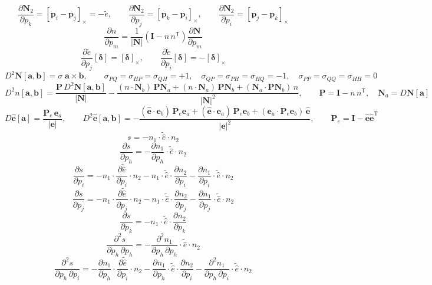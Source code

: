\[ \frac{\partial \mathbf{N}_2}{\partial p_k} = [\mathbf{p}_i - \mathbf{p}_j]_\times = -\tilde{e},\qquad \frac{\partial \mathbf{N}_2}{\partial p_j} = [\mathbf{p}_k - \mathbf{p}_i]_\times,\qquad \frac{\partial \mathbf{N}_2}{\partial p_i} = [\mathbf{p}_j - \mathbf{p}_k]_\times \]
\[ \frac{\partial n}{\partial p_m} = \frac{1}{|\mathbf{N}|}\left(\mathbf{I} - n\,n^{\mathsf T}\right)\frac{\partial \mathbf{N}}{\partial p_m} \]
\[ \frac{\partial \tilde{e}}{\partial p_j}[\boldsymbol\delta] = [\boldsymbol\delta]_\times,\qquad \frac{\partial \tilde{e}}{\partial p_i}[\boldsymbol\delta] = -[\boldsymbol\delta]_\times \]
\[ D^2\mathbf{N}[\mathbf{a}, \mathbf{b}] = \sigma\;\mathbf{a}\times\mathbf{b},\qquad \sigma_{PQ} = \sigma_{HP} = \sigma_{QH} = +1,\quad \sigma_{QP} = \sigma_{PH} = \sigma_{HQ} = -1,\quad \sigma_{PP} = \sigma_{QQ} = \sigma_{HH} = 0 \]
\[ D^2 n[\mathbf{a}, \mathbf{b}] = \frac{\mathbf{P}\,D^2\mathbf{N}[\mathbf{a}, \mathbf{b}]}{|\mathbf{N}|} - \frac{(n\cdot \mathbf{N}_b)\,\mathbf{P}\mathbf{N}_a + (n\cdot \mathbf{N}_a)\,\mathbf{P}\mathbf{N}_b + (\mathbf{N}_a\cdot\mathbf{P}\mathbf{N}_b)\,n}{|\mathbf{N}|^2},\qquad \mathbf{P} = \mathbf{I} - n\,n^{\mathsf T},\quad \mathbf{N}_a = D\mathbf{N}[\mathbf{a}] \]
\[ D\hat{\mathbf{e}}[\mathbf{a}] = \frac{\mathbf{P}_e\,\mathbf{e}_a}{|\mathbf{e}|},\qquad D^2\hat{\mathbf{e}}[\mathbf{a}, \mathbf{b}] = -\frac{(\hat{\mathbf{e}}\cdot\mathbf{e}_b)\,\mathbf{P}_e\mathbf{e}_a + (\hat{\mathbf{e}}\cdot\mathbf{e}_a)\,\mathbf{P}_e\mathbf{e}_b + (\mathbf{e}_a\cdot\mathbf{P}_e\mathbf{e}_b)\,\hat{\mathbf{e}}}{|\mathbf{e}|^2},\qquad \mathbf{P}_e = \mathbf{I} - \hat{\mathbf{e}}\hat{\mathbf{e}}^{\mathsf T} \]
\[ s = - n_1 \cdot \tilde{\hat{e}} \cdot n_2 \]
\[ \frac{\partial s}{\partial p_{h}} = - \frac{\partial n_1}{\partial p_{h}} \cdot \tilde{\hat{e}} \cdot n_2 \]
\[ \frac{\partial s}{\partial p_{i}} = - n_1 \cdot \frac{\partial \tilde{\hat{e}}}{\partial p_{i}} \cdot n_2 - n_1 \cdot \tilde{\hat{e}} \cdot \frac{\partial n_2}{\partial p_{i}} - \frac{\partial n_1}{\partial p_{i}} \cdot \tilde{\hat{e}} \cdot n_2 \]
\[ \frac{\partial s}{\partial p_{j}} = - n_1 \cdot \frac{\partial \tilde{\hat{e}}}{\partial p_{j}} \cdot n_2 - n_1 \cdot \tilde{\hat{e}} \cdot \frac{\partial n_2}{\partial p_{j}} - \frac{\partial n_1}{\partial p_{j}} \cdot \tilde{\hat{e}} \cdot n_2 \]
\[ \frac{\partial s}{\partial p_{k}} = - n_1 \cdot \tilde{\hat{e}} \cdot \frac{\partial n_2}{\partial p_{k}} \]
\[ \frac{\partial^2 s}{\partial p_{h}\,\partial p_{h}} = - \frac{\partial^{2} n_1}{\partial p_{h}\,\partial p_{h}} \cdot \tilde{\hat{e}} \cdot n_2 \]
\[ \frac{\partial^2 s}{\partial p_{h}\,\partial p_{i}} = - \frac{\partial n_1}{\partial p_{h}} \cdot \frac{\partial \tilde{\hat{e}}}{\partial p_{i}} \cdot n_2 - \frac{\partial n_1}{\partial p_{h}} \cdot \tilde{\hat{e}} \cdot \frac{\partial n_2}{\partial p_{i}} - \frac{\partial^{2} n_1}{\partial p_{h}\,\partial p_{i}} \cdot \tilde{\hat{e}} \cdot n_2 \]
